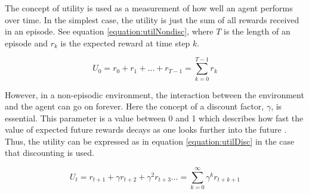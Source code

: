 The concept of utility is used as a measurement of how well an agent performs
over time. In the simplest case, the utility is just the sum of all rewards
received in an episode. See equation \eqref{equation:utilNondisc}, where $T$ is the
length of an episode and $r_k$ is the expected reward at time step $k$.

\begin{equation}
\label{equation:utilNondisc}
U_0 = r_{0} + r_{1} + \dots + r_{T-1}
  = \sum\limits_{k = 0}^{T-1} r_{k}
\end{equation}

However, in a non-episodic environment, the interaction between the environment and the agent can go on forever.
Here the concept of a discount factor, $\gamma$, is essential. This parameter
is a value between 0 and 1 which describes how fast the value of expected
future rewards decays as one looks further into the future
\parencite{barto1998reinforcement}. Thus, the utility can be expressed as in
equation \eqref{equation:utilDisc} in the case that discounting is used. 

\begin{equation}
\label{equation:utilDisc}
U_{t} = r_{t + 1} + \gamma r_{t + 2} + \gamma^2 r_{t + 3} \dots
  =  \sum\limits_{k = 0}^\infty \gamma^kr_{t+k+1}
\end{equation}






